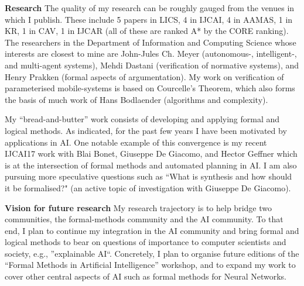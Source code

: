 \documentclass[10.5pt,a4paper,sans]{moderncv}
\begin{document}
\textbf{Research}
The quality of my research can be roughly gauged from the venues in which I publish. These include 5 papers in LICS, 4 in IJCAI, 4 in AAMAS, 1 in KR, 1 in CAV, 1 in IJCAR (all of these are ranked A* by the CORE ranking). The researchers in the Department of Information and Computing Science whose interests are closest to mine are 
John-Jules Ch. Meyer (autonomous-, intelligent-, and multi-agent systems), Mehdi Dastani (verification of normative systems), and Henry Prakken (formal aspects of argumentation). My work on verification of parameterised mobile-systems is based on Courcelle's Theorem, which also forms the basis of much work of Hans Bodlaender (algorithms and complexity). 



My ``bread-and-butter'' work consists of developing and applying formal and logical methods. As indicated, for the past few years I have been motivated by applications in AI. One notable example of this convergence is my recent IJCAI17 work with Blai Bonet, Giuseppe De Giacomo, and Hector Geffner which is at the intersection of formal methods and automated planning in AI. I am also pursuing more speculative questions such as ``What is synthesis and how should it be formalised?" (an active topic of investigation with Giuseppe De Giacomo).

 \textbf{Vision for future research}
My research trajectory is to help bridge two communities, the formal-methods community and the AI community. To that end, I plan to continue my integration in the AI community and bring formal and logical methods to bear on questions of importance to computer scientists and society, e.g., ''explainable AI``. Concretely, I plan to organise future editions of the ``Formal Methods in Artificial Intelligence'' workshop, and to expand my work to cover other central aspects of AI such as formal methods for Neural Networks.
\end{document}
